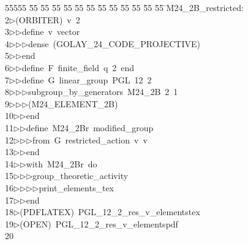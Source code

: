 %
%
\begin{tabbing}
55555 \= 55 \= 55 \= 55 \= 55 \= 55 \= 55 \= 55 \= 55 \= 55 \= 55 \= 55 \= 55 \= \>M24\_2B\_restricted:\\[0pt]
2\>$\triangleright$\>(ORBITER)\ v\ 2\ \\[0pt]
3\>$\triangleright$\>$\triangleright$\>define\ v\ vector\ \\[0pt]
4\>$\triangleright$\>$\triangleright$\>$\triangleright$\>dense\ (GOLAY\_24\_CODE\_PROJECTIVE)\ \\[0pt]
5\>$\triangleright$\>$\triangleright$\>end\ \\[0pt]
6\>$\triangleright$\>$\triangleright$\>define\ F\ finite\_field\ q\ 2\ end\ \\[0pt]
7\>$\triangleright$\>$\triangleright$\>define\ G\ linear\_group\ PGL\ 12\ 2\ \\[0pt]
8\>$\triangleright$\>$\triangleright$\>$\triangleright$\>subgroup\_by\_generators\ M24\_2B\ 2\ 1\ \\[0pt]
9\>$\triangleright$\>$\triangleright$\>$\triangleright$\>(M24\_ELEMENT\_2B)\ \\[0pt]
10\>$\triangleright$\>$\triangleright$\>end\ \\[0pt]
11\>$\triangleright$\>$\triangleright$\>define\ M24\_2Br\ modified\_group\ \\[0pt]
12\>$\triangleright$\>$\triangleright$\>$\triangleright$\>from\ G\ restricted\_action\ v\ v\ \\[0pt]
13\>$\triangleright$\>$\triangleright$\>end\ \\[0pt]
14\>$\triangleright$\>$\triangleright$\>with\ M24\_2Br\ do\ \\[0pt]
15\>$\triangleright$\>$\triangleright$\>$\triangleright$\>group\_theoretic\_activity\ \\[0pt]
16\>$\triangleright$\>$\triangleright$\>$\triangleright$\>$\triangleright$\>print\_elements\_tex\ \ \\[0pt]
17\>$\triangleright$\>$\triangleright$\>end\\[0pt]
18\>$\triangleright$\>(PDFLATEX)\ PGL\_12\_2\_res\_v\_elementstex\\[0pt]
19\>$\triangleright$\>(OPEN)\ PGL\_12\_2\_res\_v\_elementspdf\\[0pt]
20\>\end{tabbing}
